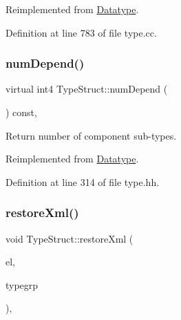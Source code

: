 Reimplemented from \mbox{\hyperlink{class_datatype_ac310ccfdc47d145f10699fa1e14e73b4}{Datatype}}.



Definition at line 783 of file type.\+cc.

\mbox{\label{class_type_struct_ad4722efdae4b6f71e7c9d2b6624e4c12}} 
\subsubsection{\texorpdfstring{numDepend()}{numDepend()}}
{\footnotesize\ttfamily virtual int4 Type\+Struct\+::num\+Depend (\begin{DoxyParamCaption}\item[{void}]{ }\end{DoxyParamCaption}) const\hspace{0.3cm}{\ttfamily [inline]}, {\ttfamily [virtual]}}



Return number of component sub-\/types. 



Reimplemented from \mbox{\hyperlink{class_datatype_ad29076ac4c3a28363df8f700c6fe4ffd}{Datatype}}.



Definition at line 314 of file type.\+hh.

\mbox{\label{class_type_struct_af2b09832da8420f6da67382a4e2d9f0e}} 
\subsubsection{\texorpdfstring{restoreXml()}{restoreXml()}}
{\footnotesize\ttfamily void Type\+Struct\+::restore\+Xml (\begin{DoxyParamCaption}\item[{const \mbox{\hyperlink{class_element}{Element}} $\ast$}]{el,  }\item[{\mbox{\hyperlink{class_type_factory}{Type\+Factory}} \&}]{typegrp }\end{DoxyParamCaption})\hspace{0.3cm}{\ttfamily [protected]}, {\ttfamily [virtual]}}



